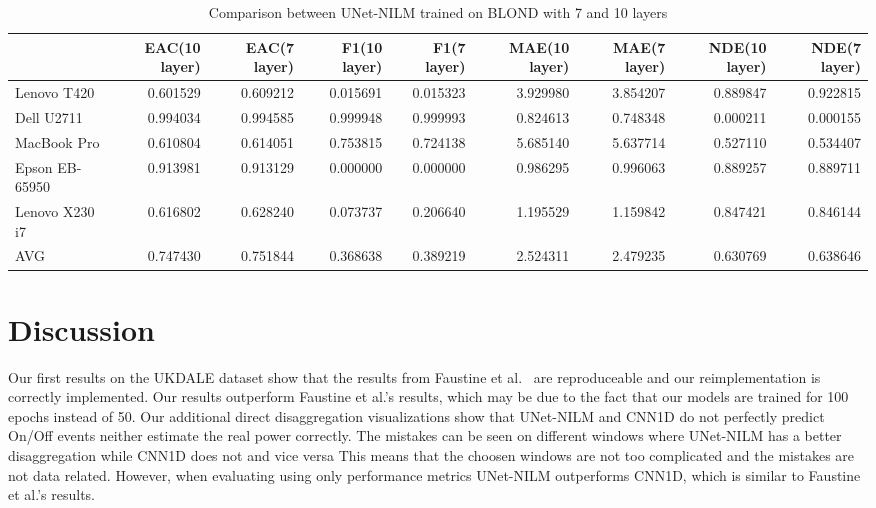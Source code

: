 \documentclass[sigconf]{acmart}
\begin{document}
\begin{table}
  \caption{Comparison between UNet-NILM trained on BLOND with 7 and 10 layers}
  \label{tab:BLONDlay}
  \begin{tabular}{lrrrrrrrr}
    \hline\hline
    \toprule
    {} &  EAC(10 layer) &  EAC(7 layer) &  F1(10 layer) &  F1(7 layer) &  MAE(10 layer) &  MAE(7 layer) &  NDE(10 layer) &  NDE(7 layer) \\
    \hline
    \midrule
    Lenovo T420             &       0.601529 &      0.609212 &      0.015691 &     0.015323 &       3.929980 &      3.854207 &       0.889847 &      0.922815 \\
    Dell U2711              &       0.994034 &      0.994585 &      0.999948 &     0.999993 &       0.824613 &      0.748348 &       0.000211 &      0.000155 \\
    MacBook Pro  &       0.610804 &      0.614051 &      0.753815 &     0.724138 &       5.685140 &      5.637714 &       0.527110 &      0.534407 \\
    Epson EB-65950          &       0.913981 &      0.913129 &      0.000000 &     0.000000 &       0.986295 &      0.996063 &       0.889257 &      0.889711 \\
    Lenovo X230 i7          &       0.616802 &      0.628240 &      0.073737 &     0.206640 &       1.195529 &      1.159842 &       0.847421 &      0.846144 \\
    \hline
    AVG                     &       0.747430 &      0.751844 &      0.368638 &     0.389219 &       2.524311 &      2.479235 &       0.630769 &      0.638646 \\
    \bottomrule
    \end{tabular}    
\end{table}

\section{Discussion}\label{chapter:discussion}
Our first results on the UKDALE dataset show that the results from Faustine et al.~\cite{unetnilm} are reproduceable and our reimplementation is correctly
implemented. Our results outperform Faustine et al.'s results, which may be due to the fact that our models are trained for 100 epochs instead of 50.
Our additional direct disaggregation visualizations show that UNet-NILM and CNN1D do not perfectly predict On/Off events neither estimate the real power correctly. 
The mistakes can be seen on different windows where UNet-NILM has a better disaggregation while CNN1D does not and vice versa
This means that the choosen windows are not too complicated and the mistakes are not data related.
However, when evaluating using only performance metrics UNet-NILM outperforms CNN1D, which is similar to Faustine et al.'s results.
\end{document}
